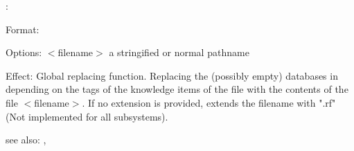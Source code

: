 \colab{} \replace:

Format: 

Options: $<$filename$>$ a stringified or normal pathname

Effect: Global replacing function.
        Replacing the (possibly empty) databases in \COLAB{} depending
        on the tags of the knowledge items of the file with the contents
        of the file $<$filename$>$.
	If no extension is provided, \COLAB{} extends the filename with 
        ".rf" (Not implemented for all subsystems).

see also: \consult, \destroy

